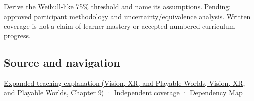 Derive the Weibull-like 75\% threshold and name its assumptions. Pending: approved participant methodology and uncertainty/equivalence analysis. Written coverage is not a claim of learner mastery or accepted numbered-curriculum progress.

\subsection{Source and navigation}\label{appendix-1759f03e8ce7-source-and-navigation}

\href{../07-Vision-XR-and-Playable-Worlds/main.pdf\#nameddest=04-visual-computing-ii-ch042-a-threshold-is-evidence-from-a-procedure-not-a-universal-border}{Expanded teaching explanation (Vision, XR, and Playable Worlds, Vision, XR, and Playable Worlds, Chapter 9)} · \hyperref[appendix-fd090d982a15-xr01---independent-seeing-and-representation-source]{Independent coverage} · \hyperref[appendix-4ad47bdd269a]{Dependency Map}
